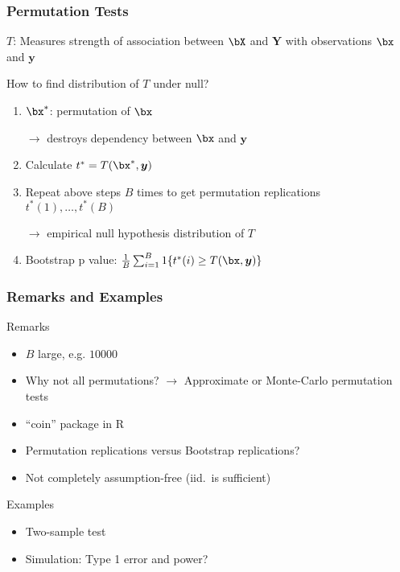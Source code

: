 \begin{frame}
	\frametitle{Permutation Tests}
	$T$: Measures strength of association between $\bX$ and $\boldsymbol Y$ with observations $\bx$ and $\boldsymbol y$
	
	\vfill
	
	\begin{block}{How to find distribution of $T$ under null?}
		\begin{enumerate}
			\item $\bx^*$: permutation of $\bx$
			
			$\rightarrow$ destroys dependency between $\bx$ and $\boldsymbol y$
			\item Calculate $t^* = T(\bx^*, \boldsymbol y)$
			\item Repeat above steps $B$ times to get permutation replications $t^*(1), \dots, t^*(B)$
			
			$\rightarrow$ empirical null hypothesis distribution of $T$
			\item Bootstrap p value: $\frac{1}{B}\sum_{i = 1}^B 1\{t^*(i) \ge T(\bx, \boldsymbol y)\}$
		\end{enumerate}
	\end{block}
\end{frame}

\begin{frame}
	\frametitle{Remarks and Examples}
	\begin{block}{Remarks}
		\begin{itemize}
			\item $B$ large, e.g. $10000$
			\item Why not all permutations? $\rightarrow$ Approximate or Monte-Carlo permutation tests
			\item ``coin'' package in R
			\item Permutation replications versus Bootstrap replications?
			\item Not completely assumption-free (iid.\ is sufficient)
		\end{itemize}
	\end{block}
	
	\begin{exampleblock}{Examples}
		\begin{itemize}
			\item Two-sample test
			\item Simulation: Type 1 error and power?
		\end{itemize}
	\end{exampleblock}
\end{frame}

